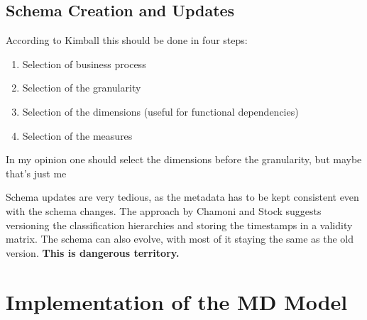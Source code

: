 \documentclass{article}
\begin{document}
\subsection{Schema Creation and Updates}
According to Kimball this should be done in four steps:
\begin{enumerate}
    \item Selection of business process
    \item Selection of the granularity
    \item Selection of the dimensions (useful for functional dependencies)
    \item Selection of the measures
\end{enumerate}
\begin{keypointbox}
    In my opinion one should select the dimensions before the granularity, but maybe that's just me
\end{keypointbox}

Schema updates are very tedious, as the metadata has to be kept consistent even with the schema changes.
The approach by Chamoni and Stock suggests versioning the classification hierarchies and storing the timestamps in a validity matrix.
The schema can also evolve, with most of it staying the same as the old version.
\textbf{This is dangerous territory.}

\section{Implementation of the MD Model}
\end{document}
